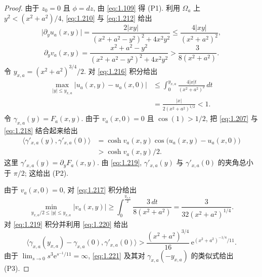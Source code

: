 \begin{proof}
由于 $z_0=0$ 且 $\phi=dz$, 由 \eqref{eq:1.109} 得 (P1). 利用 $\Omega_a$ 上
$y^{2}<(x^{2}+a^{2})/4$, \eqref{eq:1.210} 与 \eqref{eq:1.212} 给出
\begin{equation}
\bigl|\partial_y u_a(x,y)\bigr|
 =\frac{2|xy|}{(x^{2}+a^{2}-y^{2})^{2}+4x^{2}y^{2}}
 \leq\frac{4|xy|}{(x^{2}+a^{2})^{2}},
\label{eq:1.216}
\end{equation}
\begin{equation}
\partial_y v_a(x,y)
 =\frac{x^{2}+a^{2}-y^{2}}{(x^{2}+a^{2}-y^{2})^{2}+4x^{2}y^{2}}
 >\frac{3}{8(x^{2}+a^{2})}.
\label{eq:1.217}
\end{equation}
令 $y_{x,a}=(x^{2}+a^{2})^{3/4}/2$. 对 \eqref{eq:1.216} 积分给出
\begin{equation}
\begin{aligned}
\max_{|y|\leq y_{x,a}}\bigl|u_a(x,y)-u_a(x,0)\bigr|
&\leq\int_0^{y_{x,a}}\frac{4|x|t}{(x^{2}+a^{2})^{2}}\,dt\\
&=\frac{|x|}{2(x^{2}+a^{2})^{1/2}}<1.
\end{aligned}
\label{eq:1.218}
\end{equation}
令 $\gamma_{x,a}(y)=F_a(x,y)$. 由于 $v_a(x,0)=0$ 且 $\cos(1)>1/2$, 把
\eqref{eq:1.207} 与 \eqref{eq:1.218} 结合起来给出
\begin{equation}
\begin{aligned}
\bigl\langle\gamma'_{x,a}(y),\gamma'_{x,a}(0)\bigr\rangle
&=\cosh v_a(x,y)\cos\bigl(u_a(x,y)-u_a(x,0)\bigr)\\
&>\cosh v_a(x,y)/2.
\end{aligned}
\label{eq:1.219}
\end{equation}
这里 $\gamma'_{x,a}(y)=\partial_yF_a(x,y)$. 由 \eqref{eq:1.219},
$\gamma'_{x,a}(y)$ 与 $\gamma'_{x,a}(0)$ 的夹角总小于 $\pi/2$; 这给出
(P2).

由于 $v_a(x,0)=0$, 对 \eqref{eq:1.217} 积分给出
\begin{equation}
\min_{y_{x,a}/2\leq|y|\leq y_{x,a}}\bigl|v_a(x,y)\bigr|
 \geq\int_0^{\frac{y_{x,a}}{2}}\frac{3\,dt}{8(x^{2}+a^{2})}
 =\frac{3}{32(x^{2}+a^{2})^{1/4}}.
\label{eq:1.220}
\end{equation}
对 \eqref{eq:1.219} 积分并利用 \eqref{eq:1.220} 给出
\begin{equation}
\bigl\langle\gamma_{x,a}(y_{x,a})-\gamma_{x,a}(0),
 \gamma'_{x,a}(0)\bigr\rangle
 >\frac{(x^{2}+a^{2})^{3/4}}{16}\,
 \mathrm{e}^{(x^{2}+a^{2})^{-1/4}/11}.
\label{eq:1.221}
\end{equation}
由于 $\lim_{s\to0}s^{3}\mathrm{e}^{s^{-1}/11}=\infty$, \eqref{eq:1.221} 及其对
$\gamma_{x,a}(-y_{x,a})$ 的类似式给出 (P3).
\end{proof}

